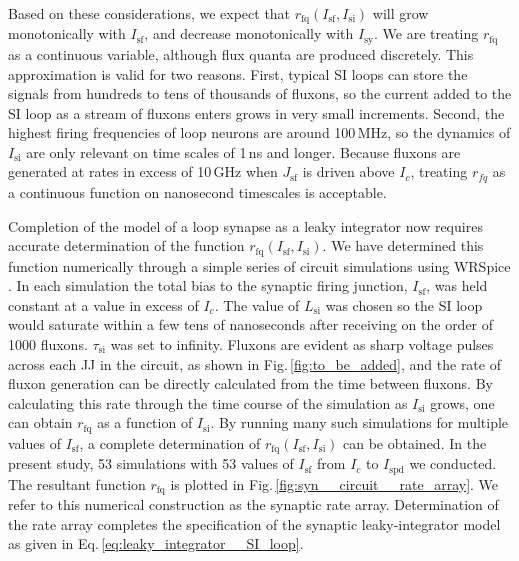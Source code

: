 \documentclass[twocolumn]{article}
\begin{document}
Based on these considerations, we expect that $r_{\mathrm{fq}}(I_{\mathrm{sf}},I_{\mathrm{si}})$ will grow monotonically with $I_{\mathrm{sf}}$, and decrease monotonically with $I_{\mathrm{sy}}$. We are treating $r_{\mathrm{fq}}$ as a continuous variable, although flux quanta are produced discretely. This approximation is valid for two reasons. First, typical SI loops can store the signals from hundreds to tens of thousands of fluxons, so the current added to the SI loop as a stream of fluxons enters grows in very small increments. Second, the highest firing frequencies of loop neurons are around 100\,MHz, so the dynamics of $I_{\mathrm{si}}$ are only relevant on time scales of 1\,ns and longer. Because fluxons are generated at rates in excess of 10\,GHz when $J_{\mathrm{sf}}$ is driven above $I_c$, treating $r_{fq}$ as a continuous function on nanosecond timescales is acceptable.

Completion of the model of a loop synapse as a leaky integrator now requires accurate determination of the function $r_{\mathrm{fq}}(I_{\mathrm{sf}},I_{\mathrm{si}})$. We have determined this function numerically through a simple series of circuit simulations using WRSpice \cite{wh1991}. In each simulation the total bias to the synaptic firing junction, $I_{\mathrm{sf}}$, was held constant at a value in excess of $I_c$. The value of $L_{\mathrm{si}}$ was chosen so the SI loop would saturate within a few tens of nanoseconds after receiving on the order of 1000 fluxons. $\tau_{\mathrm{si}}$ was set to infinity. Fluxons are evident as sharp voltage pulses across each JJ in the circuit, as shown in Fig.\,\ref{fig:to_be_added}, and the rate of fluxon generation can be directly calculated from the time between fluxons. By calculating this rate through the time course of the simulation as $I_{\mathrm{si}}$ grows, one can obtain $r_{\mathrm{fq}}$ as a function of $I_{\mathrm{si}}$. By running many such simulations for multiple values of $I_{\mathrm{sf}}$, a complete determination of $r_{\mathrm{fq}}(I_{\mathrm{sf}},I_{\mathrm{si}})$ can be obtained. In the present study, 53 simulations with 53 values of $I_{\mathrm{sf}}$ from $I_c$ to $I_{\mathrm{spd}}$ we conducted. The resultant function $r_{\mathrm{fq}}$ is plotted in Fig.\,\ref{fig:syn__circuit__rate_array}. We refer to this numerical construction as the synaptic rate array. Determination of the rate array completes the specification of the synaptic leaky-integrator model as given in Eq.\,\ref{eq:leaky_integrator__SI_loop}.
\end{document}

